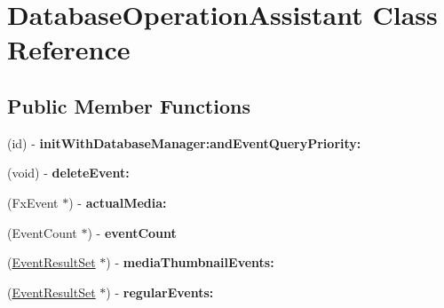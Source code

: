 \hypertarget{interface_database_operation_assistant}{
\section{\-Database\-Operation\-Assistant \-Class \-Reference}
\label{interface_database_operation_assistant}
}
\subsection*{\-Public \-Member \-Functions}
\begin{DoxyCompactItemize}
\item 
\hypertarget{interface_database_operation_assistant_a9c35894354bc7fbe7c15fe80f5f2083e}{
(id) -\/ {\bfseries init\-With\-Database\-Manager\-:and\-Event\-Query\-Priority\-:}}
\label{interface_database_operation_assistant_a9c35894354bc7fbe7c15fe80f5f2083e}

\item 
\hypertarget{interface_database_operation_assistant_a38becb564505d1172908a28eb3bb8359}{
(void) -\/ {\bfseries delete\-Event\-:}}
\label{interface_database_operation_assistant_a38becb564505d1172908a28eb3bb8359}

\item 
\hypertarget{interface_database_operation_assistant_a27c8e46f77c1d293d07d7f05621b84e0}{
(\-Fx\-Event $\ast$) -\/ {\bfseries actual\-Media\-:}}
\label{interface_database_operation_assistant_a27c8e46f77c1d293d07d7f05621b84e0}

\item 
\hypertarget{interface_database_operation_assistant_a48eeab9956af49415ed6207dda673b36}{
(\-Event\-Count $\ast$) -\/ {\bfseries event\-Count}}
\label{interface_database_operation_assistant_a48eeab9956af49415ed6207dda673b36}

\item 
\hypertarget{interface_database_operation_assistant_ac9eda4564301da0417d986d3cea8e7ee}{
(\hyperlink{interface_event_result_set}{\-Event\-Result\-Set} $\ast$) -\/ {\bfseries media\-Thumbnail\-Events\-:}}
\label{interface_database_operation_assistant_ac9eda4564301da0417d986d3cea8e7ee}

\item 
\hypertarget{interface_database_operation_assistant_a7ebc857a716573b97471cab89a363ce9}{
(\hyperlink{interface_event_result_set}{\-Event\-Result\-Set} $\ast$) -\/ {\bfseries regular\-Events\-:}}
\label{interface_database_operation_assistant_a7ebc857a716573b97471cab89a363ce9}


\end{DoxyCompactItemize}
